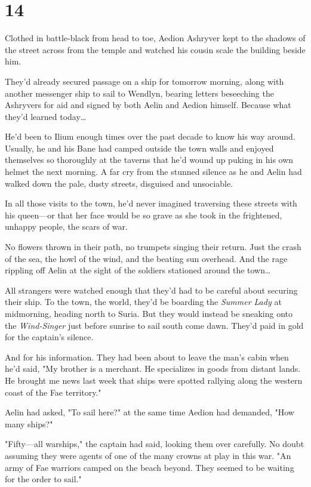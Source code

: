 
\chapter{14}

Clothed in battle-black from head to toe, Aedion Ashryver kept to the shadows of the street across from the temple and watched his cousin scale the building beside him.

They'd already secured passage on a ship for tomorrow morning, along with another messenger ship to sail to Wendlyn, bearing letters beseeching the Ashryvers for aid and signed by both Aelin and Aedion himself. Because what they'd learned today\ldots{}

He'd been to Ilium enough times over the past decade to know his way around. Usually, he and his Bane had camped outside the town walls and enjoyed themselves so thoroughly at the taverns that he'd wound up puking in his own helmet the next morning. A far cry from the stunned silence as he and Aelin had walked down the pale, dusty streets, disguised and unsociable.

In all those visits to the town, he'd never imagined traversing these streets with his queen---or that her face would be so grave as she took in the frightened, unhappy people, the scars of war.

No flowers thrown in their path, no trumpets singing their return. Just the crash of the sea, the howl of the wind, and the beating sun overhead. And the rage rippling off Aelin at the sight of the soldiers stationed around the town\ldots{}

All strangers were watched enough that they'd had to be careful about securing their ship. To the town, the world, they'd be boarding the
\emph{Summer Lady} at midmorning, heading north to Suria. But they would instead be sneaking onto the \emph{Wind-Singer} just before sunrise to sail south come dawn. They'd paid in gold for the captain's silence.

And for his information. They had been about to leave the man's cabin when he'd said, "My brother is a merchant. He specializes in goods from distant lands. He brought me news last week that ships were spotted rallying along the western coast of the Fae territory."

Aelin had asked, "To sail here?" at the same time Aedion had demanded, "How many ships?"

"Fifty---all warships," the captain had said, looking them over carefully. No doubt assuming they were agents of one of the many crowns at play in this war. "An army of Fae warriors camped on the beach beyond. They seemed to be waiting for the order to sail."

